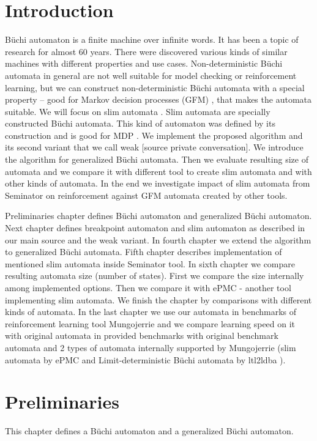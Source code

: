 \documentclass[
	digital,
nolof, nolot
]{fithesis3}
\begin{document}
	\chapter{Introduction}
	Büchi automaton is a finite machine over infinite words. It has been a topic of research for almost 60 years.
	There were discovered various kinds of similar machines with different properties and use cases.
	Non-deterministic Büchi automata in general are not well suitable for model checking or reinforcement learning, but we can construct non-deterministic Büchi automata with a special property -- good for Markov decision processes (GFM)  \cite{hlavni}, that makes the automata suitable. We will focus on slim automata \cite{hlavni}.
	Slim automata are specially constructed Büchi automata. This kind of automaton was defined by its construction and is good for MDP \cite{hlavni}. We implement the proposed algorithm and its second variant that we call weak [source private conversation]. We introduce the algorithm for generalized Büchi automata. Then we evaluate resulting size of automata and we compare it with different tool to create slim automata and with other kinds of automata. In the end we investigate impact of slim automata from Seminator on reinforcement against GFM automata created by other tools.
	
	Preliminaries chapter defines Büchi automaton and generalized Büchi automaton. Next chapter defines breakpoint automaton and slim automaton as described in our main source \cite{hlavni} and the weak variant. In fourth chapter we extend the algorithm to generalized Büchi automata. Fifth chapter describes implementation of mentioned slim automata inside Seminator \cite{Klokočka2017thesis}\cite{seminator}\cite{seminator2} tool. In sixth chapter we compare resulting automata size (number of states). First we compare the size internally among implemented options. Then we compare it with ePMC \cite{epmc} - another tool implementing slim automata. We finish the chapter by comparisons with different kinds of automata. In the last chapter we use our automata in benchmarks of reinforcement learning tool Mungojerrie\cite{mungojerrie} and we compare learning speed on it with original automata in provided benchmarks with original benchmark automata and 2 types of automata internally supported by Mungojerrie (slim automata by ePMC and Limit-deterministic Büchi automata by ltl2ldba \cite{ltl2ldba}).
	
	

	\chapter{Preliminaries}
		This chapter defines a Büchi automaton and a generalized Büchi automaton. 
		
\end{document}
